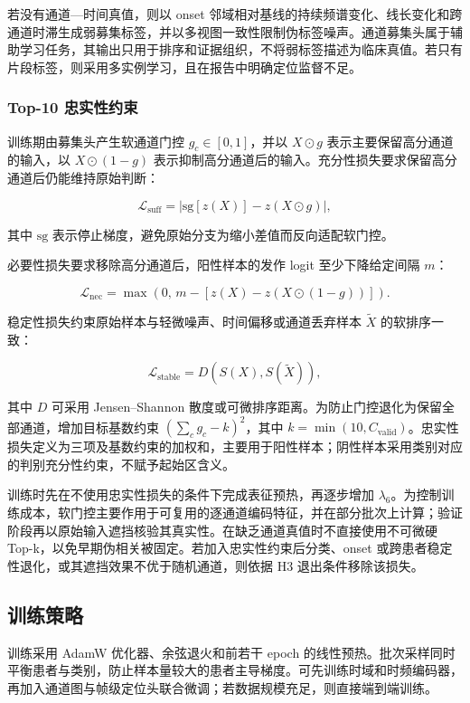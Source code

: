 \documentclass{cumcmthesis}
\numberwithin{figure}{section} %
\numberwithin{table}{section} %
\begin{document}
若没有通道—时间真值，则以 onset 邻域相对基线的持续频谱变化、线长变化和跨通道时滞生成弱募集标签，并以多视图一致性限制伪标签噪声。通道募集头属于辅助学习任务，其输出只用于排序和证据组织，不将弱标签描述为临床真值。若只有片段标签，则采用多实例学习，且在报告中明确定位监督不足。

\subsubsection{Top-10 忠实性约束}

训练期由募集头产生软通道门控 $g_c\in[0,1]$，并以 $X\odot g$ 表示主要保留高分通道的输入，以 $X\odot(1-g)$ 表示抑制高分通道后的输入。充分性损失要求保留高分通道后仍能维持原始判断：

$$
\mathcal{L}_{\mathrm{suff}}=
\left|\mathrm{sg}[z(X)]-z(X\odot g)\right|,
$$

其中 $\mathrm{sg}$ 表示停止梯度，避免原始分支为缩小差值而反向适配软门控。

必要性损失要求移除高分通道后，阳性样本的发作 logit 至少下降给定间隔 $m$：

$$
\mathcal{L}_{\mathrm{nec}}=
\max\left(0,\,
m-[z(X)-z(X\odot(1-g))]
\right).
$$

稳定性损失约束原始样本与轻微噪声、时间偏移或通道丢弃样本 $\tilde X$ 的软排序一致：

$$
\mathcal{L}_{\mathrm{stable}}=
D\left(S(X),S(\tilde X)\right),
$$

其中 $D$ 可采用 Jensen–Shannon 散度或可微排序距离。为防止门控退化为保留全部通道，增加目标基数约束 $\left(\sum_c g_c-k\right)^2$，其中 $k=\min(10,C_{\mathrm{valid}})$。忠实性损失定义为三项及基数约束的加权和，主要用于阳性样本；阴性样本采用类别对应的判别充分性约束，不赋予起始区含义。

训练时先在不使用忠实性损失的条件下完成表征预热，再逐步增加 $\lambda_6$。为控制训练成本，软门控主要作用于可复用的逐通道编码特征，并在部分批次上计算；验证阶段再以原始输入遮挡核验其真实性。在缺乏通道真值时不直接使用不可微硬 Top-k，以免早期伪相关被固定。若加入忠实性约束后分类、onset 或跨患者稳定性退化，或其遮挡效果不优于随机通道，则依据 H3 退出条件移除该损失。

\subsection{训练策略} 

训练采用 AdamW 优化器、余弦退火和前若干 epoch 的线性预热。批次采样同时平衡患者与类别，防止样本量较大的患者主导梯度。可先训练时域和时频编码器，再加入通道图与帧级定位头联合微调；若数据规模充足，则直接端到端训练。
\end{document}
